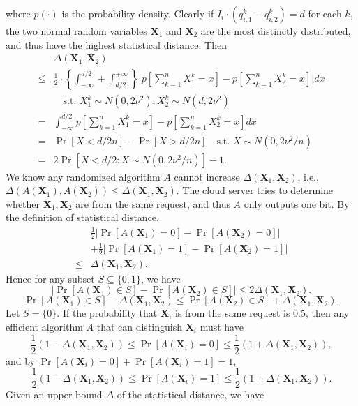 \documentclass{IEEEtran}
\begin{document}
where $p(\cdot)$ is the probability density. 
Clearly if $I_i\cdot(q_{i,1}^k-q_{i,2}^k)=d$ for each $k$, the two normal random variables $\mathbf{X}_1$ and $\mathbf{X}_2$ are the most distinctly distributed, and thus have the highest statistical distance. Then
$$
\begin{aligned}
&\Delta(\mathbf{X}_1, \mathbf{X}_2) \\
\leq& \frac{1}{2}\cdot\left\{ \int_{-\infty}^{d/2} + \int_{d/2}^{+\infty} \right\} \bigg|p[\sum_{k=1}^n X_1^k = x] - p[\sum_{k=1}^n X_2^k = x]\bigg|dx \\
&\quad \textrm{s.t. } X_1^k\sim N(0,2\nu^2), X_2^k\sim N(d,2\nu^2)\\
=& \int_{-\infty}^{d/2} p[\sum_{k=1}^n X_1^k = x] - p[\sum_{k=1}^n X_2^k = x] dx \\
=& \Pr[X<d/2n] - \Pr[X>d/2n] \quad \textrm{s.t. } X\sim N(0,2\nu^2/n) \\
=& 2\Pr[X<d/2: X\sim N(0,2\nu^2/n)]-1.
\end{aligned}
$$
We know any randomized algorithm $A$ cannot increase $\Delta(\mathbf{X}_1, \mathbf{X}_2)$, i.e., $\Delta(A(\mathbf{X}_1), A(\mathbf{X}_2)) \leq \Delta(\mathbf{X}_1, \mathbf{X}_2)$. The cloud server tries to determine whether $\mathbf{X}_1, \mathbf{X}_2$ are from the same request, and thus $A$ only outputs one bit. By the definition of statistical distance,
$$\begin{aligned}
&\frac{1}{2}|\Pr[A(\mathbf{X}_1)=0]-\Pr[A(\mathbf{X}_2)=0]| \\
&+ \frac{1}{2}|\Pr[A(\mathbf{X}_1)=1]-\Pr[A(\mathbf{X}_2)=1]| \\
\leq& \Delta(\mathbf{X}_1, \mathbf{X}_2).
\end{aligned}$$
Hence for any subset $S \subseteq \{0,1\}$, we have
$$|\Pr[A(\mathbf{X}_1)\in S]-\Pr[A(\mathbf{X}_2)\in S]| \leq 2 \Delta(\mathbf{X}_1, \mathbf{X}_2).$$
$$\Pr[A(\mathbf{X}_1)\in S] - \Delta(\mathbf{X}_1, \mathbf{X}_2) \leq \Pr[A(\mathbf{X}_2)\in S]+\Delta(\mathbf{X}_1, \mathbf{X}_2).$$
Let $S=\{0\}$. If the probability that $\mathbf{X}_i$ is from the same request is 0.5, then any efficient algorithm $A$ that can distinguish $\mathbf{X}_i$ must have
$$\frac{1}{2}(1-\Delta(\mathbf{X}_1, \mathbf{X}_2))\leq\Pr[A(\mathbf{X}_i)=0]\leq \frac{1}{2}(1+\Delta(\mathbf{X}_1, \mathbf{X}_2)),$$
and by $\Pr[A(\mathbf{X}_i)=0]+\Pr[A(\mathbf{X}_i)=1]=1$,
$$\frac{1}{2}(1-\Delta(\mathbf{X}_1, \mathbf{X}_2))\leq\Pr[A(\mathbf{X}_i)=1]\leq \frac{1}{2}(1+\Delta(\mathbf{X}_1, \mathbf{X}_2)).$$
Given an upper bound $\Delta$ of the statistical distance, we have 
\end{document}
